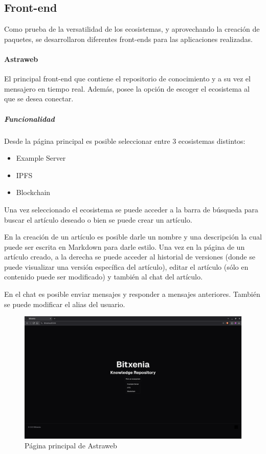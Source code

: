 \subsection{Front-end}


Como prueba de la versatilidad de los ecosistemas, y aprovechando la creación de paquetes, se desarrollaron diferentes front-ends para las aplicaciones realizadas.

\paragraph{Astraweb}

El principal front-end que contiene el repositorio de conocimiento y a su vez el mensajero en tiempo real. Además, posee la opción de escoger el ecosistema al que se desea conectar.

\subparagraph{Funcionalidad}

Desde la página principal es posible seleccionar entre 3 ecosistemas distintos:

\begin{itemize}
    \item Example Server
    \item IPFS
    \item Blockchain
\end{itemize}

Una vez seleccionado el ecosistema se puede acceder a la barra de búsqueda para buscar el artículo deseado o bien se puede crear un artículo.

En la creación de un artículo es posible darle un nombre y una descripción la cual puede ser escrita en Markdown para darle estilo. Una vez en la página de un artículo creado, a la derecha se puede acceder al historial de versiones (donde se puede visualizar una versión específica del artículo), editar el artículo (sólo en contenido puede ser modificado) y también al chat del artículo.

En el chat es posible enviar mensajes y responder a mensajes anteriores. También se puede modificar el alias del usuario.

\begin{figure}[H]
    \centering
    \includegraphics[width=1\linewidth]{img/astraweb-main-page.png}
    \caption{Página principal de Astraweb}
    \label{fig:astraweb-main-page}
\end{figure}


